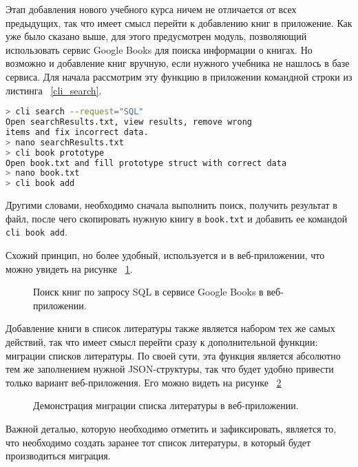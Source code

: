 Этап добавления нового учебного курса ничем не отличается от всех предыдущих, так что имеет смысл перейти к добавлению книг в приложение.
Как уже было сказано выше, для этого предусмотрен модуль, позволяющий использовать сервис Google Books для поиска информации о
книгах. Но возможно и добавление книг вручную, если нужного учебника не нашлось в базе сервиса. 
Для начала рассмотрим эту функцию в приложении командной строки из листинга ~\ref{cli_search}.

\begin{lstlisting}[language=bash, caption = {Поиск книг по запросу SQL в сервисе Google Books в приложении командной строки.}, captionpos=b, label={cli_search}]
> cli search --request="SQL"
Open searchResults.txt, view results, remove wrong 
items and fix incorrect data.
> nano searchResults.txt 
> cli book prototype
Open book.txt and fill prototype struct with correct data
> nano book.txt
> cli book add
\end{lstlisting}

Другими словами, необходимо сначала выполнить поиск, получить результат в файл, после чего скопировать нужную книгу в
\texttt{book.txt} и добавить ее командой \texttt{cli book add}.

Схожий принцип, но более удобный, используется и в веб-приложении, что можно увидеть на рисунке ~\ref{web_search}.

\begin{figure}[h!]
	\caption{Поиск книг по запросу SQL в сервисе Google Books в веб-приложении.}
	\label{web_search}
\end{figure}

Добавление книги в список литературы также является набором тех же самых действий, так что имеет смысл перейти сразу к дополнительной функции:
миграции списков литературы. По своей сути, эта функция является абсолютно тем же заполнением нужной JSON-структуры, так что будет
удобно привести только вариант веб-приложения. Его можно видеть на рисунке ~\ref{web_migrate}

\begin{figure}[h!]
	\caption{Демонстрация миграции списка литературы в веб-приложении.}
	\label{web_migrate}
\end{figure}

Важной деталью, которую необходимо отметить и зафиксировать, является то, что необходимо создать заранее тот список литературы, в который
будет производиться миграция.

